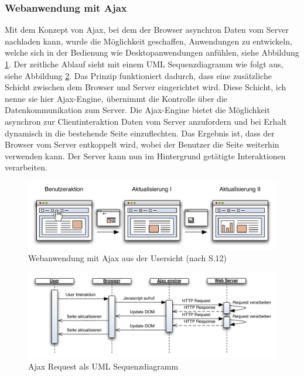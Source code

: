   \subsubsection{Webanwendung mit Ajax}
  
  Mit dem Konzept von \ac{Ajax}, bei dem der Browser asynchron Daten vom Server
  nachladen kann, wurde die Möglichkeit geschaffen, Anwendungen zu entwickeln,
  welche sich in der Bedienung wie Desktopanwendungen anfühlen, siehe Abbildung
  \ref{img:ajaxPageReload}. Der zeitliche Ablauf sieht mit einem \ac{UML}
  Sequenzdiagramm wie folgt aus, siehe Abbildung
  \ref{img:sequenzdiagrammAjaxPageReload}. Das Prinzip funktioniert dadurch,
  dass eine zusätzliche Schicht zwischen dem Browser und Server eingerichtet
  wird. Diese Schicht, ich nenne sie hier Ajax-Engine, übernimmt die Kontrolle
  über die Datenkommunikation zum Server. Die Ajax-Engine bietet die
  Möglichkeit asynchron zur Clientinteraktion Daten vom Server anzufordern und
  bei Erhalt dynamisch in die bestehende Seite einzuflechten. Das Ergebnis ist,
  dass der Browser vom Server entkoppelt wird, wobei der Benutzer die Seite
  weiterhin verwenden kann. Der Server kann nun im Hintergrund getätigte
  Interaktionen verarbeiten.
  
  \begin{figure}[hbt]
    \begin{center}
      \includegraphics[width=\textwidth]{./image/ajaxPageReload.pdf}
      \caption{Webanwendung mit Ajax aus der Usersicht (nach
      \cite{DiplomarbeitStephanSchuster} S.12)}
      \label{img:ajaxPageReload}
    \end{center}
  \end{figure}
  
  \begin{figure}[hbt]
    \begin{center}
      \includegraphics[width=\textwidth]{./image/sequenzdiagrammAjaxPageReload.pdf}
      \caption{Ajax Request als \ac{UML} Sequenzdiagramm}
      \label{img:sequenzdiagrammAjaxPageReload}
    \end{center}
  \end{figure}
  
